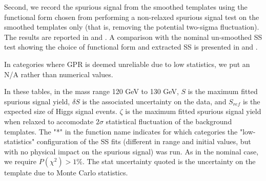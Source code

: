Second, we record the spurious signal from the smoothed templates using the functional form chosen from performing a non-relaxed spurious signal test on the smoothed templates only (that is, removing the potential two-sigma fluctuation). The results are reported in \Tab{\ref{tab:spurious_sig_gptight}} and \Tab{\ref{tab:spurious_sig_gptight2}}. A comparison with the nominal un-smoothed SS test showing the choice of functional form and extracted SS is presented in \Tab{\ref{tab:comp_smooth_unsmoothtight1}} and \Tab{\ref{tab:comp_smooth_unsmoothtight2}}.

In categories where GPR is deemed unreliable due to low statistics, we put an N/A rather than numerical values. 

In these tables, in the mass range 120 GeV to 130 GeV, $S$ is the maximum fitted spurious signal yield, $\delta S$ is the associated uncertainty on the data, and $S_{ref}$ is the expected size of Higgs signal events. $\zeta$ is the maximum fitted spurious signal yield when relaxed to accomodate $2\sigma$ statistical fluctuation of the background templates. The "*" in the function name indicates for which categories the "low-statistics" configuration of the SS fits (different in range and initial values, but with no physical impact on the spurious signal) was run. As in the nominal case, we require $P(\chi^2) > 1\%$. The stat uncertainty quoted is the uncertainty on the template due to Monte Carlo statistics. 

